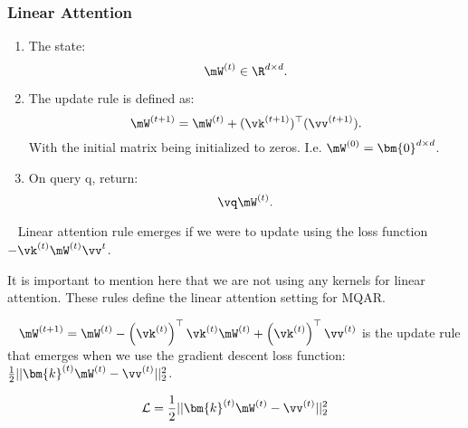 \subsubsection{Linear Attention}
\begin{enumerate}[leftmargin=*]
    \item The state: \[\state^{(\timestep)}\in\R^{\modelDim\times\modelDim}.\]
    \item The update rule is defined as:
    \[\state^{(\timestep+1)}=\state^{(\timestep)}+(\vk^{(\timestep+1)})^{\top}(\vv^{(\timestep+1)}).\] With the initial matrix being initialized to zeros. I.e. $\state^{(0)} = \bm{0}^{\modelDim\times\modelDim}$.
    \item On query q, return:
    \[\vq\mW^{(\timestep)}.\]
\end{enumerate}
\begin{lemma}
    ~\cite{yang2025parallelizinglineartransformersdelta} Linear attention rule emerges if we were to update using the loss function $-\vk^{(t)}\mW^{(t)}\vv^{t}$.
\end{lemma}
It is important to mention here that we are not using any kernels for linear attention.
These rules define the linear attention setting for MQAR.
\begin{lemma}\label{Lemma: DeltaRule}
    ~\cite{yang2025parallelizinglineartransformersdelta} $\cacheMatrixTime{\timestep+1}=\cacheMatrixTime{\timestep}-\keyT{\timestep}\key{\timestep}\cacheMatrixTime{\timestep}+\keyT{\timestep}\val{\timestep}$ is the update rule that emerges when we use the gradient descent loss function: $\frac{1}{2}||\bm{k}^{(\timestep)}\mW^{(\timestep)}-\vv^{(\timestep)}||_{2}^{2}$.
\end{lemma}
\begin{definition}
    \[\mathcal{L} = \frac{1}{2}||\bm{k}^{(\timestep)}\mW^{(\timestep)}-\vv^{(\timestep)}||_{2}^{2} \]
\end{definition}
